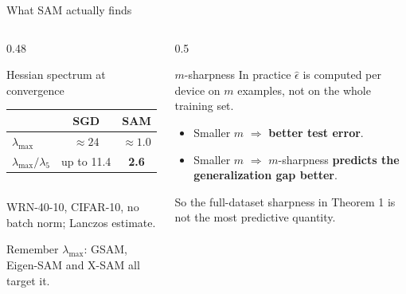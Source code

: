 \documentclass[aspectratio=169,10pt]{beamer}
\newcommand{\fl}[1]{\textcolor{flat}{#1}}
\newcommand{\mt}[1]{\textcolor{muted}{#1}}
\begin{document}
\begin{frame}{What SAM actually finds}
\begin{columns}[T]
\begin{column}{0.48\textwidth}
\begin{block}{Hessian spectrum at convergence}
\centering
\renewcommand{\arraystretch}{1.3}
\begin{tabular}{@{}lcc@{}}
& SGD & SAM\\
\midrule
$\lambda_{\max}$ & $\approx 24$ & \fl{\textbf{$\approx 1.0$}}\\
$\lambda_{\max}/\lambda_5$ & up to 11.4 & \fl{\textbf{2.6}}\\
\end{tabular}\\[4pt]
\mt{\scriptsize WRN-40-10, CIFAR-10, no batch norm; Lanczos estimate.}
\end{block}
\mt{\small Remember $\lambda_{\max}$: GSAM, Eigen-SAM and X-SAM all target it.}
\end{column}
\begin{column}{0.5\textwidth}
\begin{block}{$m$-sharpness}
In practice $\hat\epsilon$ is computed per device on $m$ examples, not on the whole training set.
\begin{itemize}
  \item Smaller $m$ $\Rightarrow$ \textbf{better test error}.
  \item Smaller $m$ $\Rightarrow$ $m$-sharpness \textbf{predicts the generalization gap better}.
\end{itemize}
\end{block}
\mt{\small So the full-dataset sharpness in Theorem 1 is not the most predictive quantity.}
\end{column}
\end{columns}
\end{frame}
\end{document}
